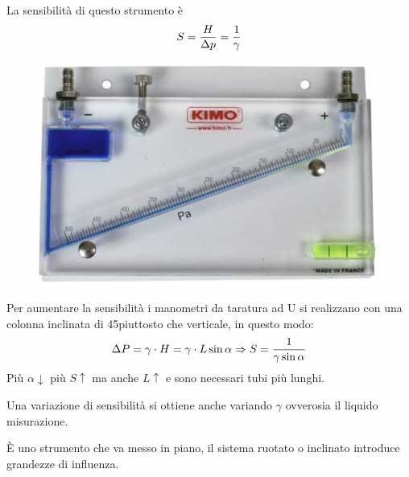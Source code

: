 \documentclass[a4paper, 15pt]{article}
\begin{document}
\begin{adjustwidth}{2in}{}
  		La sensibilità di questo strumento è 
  		\[S = {H\over \Delta p} = {1\over\gamma}\]
 \newpage
 		\begin{figure}[H]
 			\centering
 			\includegraphics[width=0.5\linewidth]{immagini/p4}
 			\label{fig:p4}
 		\end{figure} 		
  		Per aumentare la sensibilità i manometri da taratura ad U si realizzano con una colonna inclinata di 45\degree piuttosto che verticale, in questo modo: 
  		\[\Delta P = \gamma\cdot H =\gamma\cdot L\sin\alpha \Rightarrow S ={1\over\gamma\sin\alpha} \]
  		Più $\alpha\downarrow$ più $S\uparrow$ ma anche $L\uparrow$ e sono necessari tubi più lunghi.  		
  		
  		Una variazione di sensibilità si ottiene anche variando $\gamma$ ovverosia il liquido misurazione. \newline 
  		
  		È uno strumento che va messo in piano, il sistema ruotato o inclinato introduce grandezze di influenza.  
\end{adjustwidth}
\newpage
\end{document}
